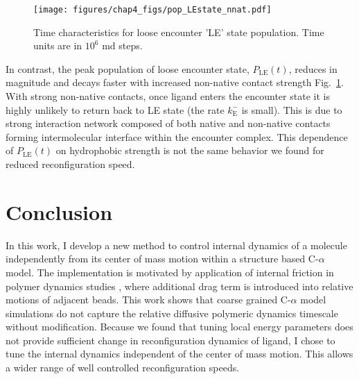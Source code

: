 \documentclass[../talant.diss.submit.tex]{subfiles}
\begin{document}
\begin{figure}[htp!]
  \centering
  \texttt{[image: figures/chap4\_figs/pop\_LEstate\_nnat.pdf]}
  \caption{ Time characteristics for loose encounter 'LE' state population.
    Time units are in $10^{6}$ md steps.}
  \label{fig:pop_LEstate_nnat}
\end{figure}
%
%

In contrast, the peak population of loose encounter state, $P_\mathrm{LE}(t)$,
reduces in magnitude and decays faster with increased
non-native contact strength Fig.~\ref{fig:pop_LEstate_nnat}.
With strong non-native contacts, once ligand enters the encounter state it is
highly unlikely to return back to LE state (the rate $k_\mathrm{E}^-$ is small).
This is due to strong interaction network composed of both native
and non-native contacts forming intermolecular interface within the encounter complex.
This dependence of $P_\mathrm{LE}(t)$ on hydrophobic strength is 
not the same behavior we found for reduced reconfiguration speed.


%
\section{\textbf{Conclusion}}\label{sect:four_seven}
%

In this work,  I develop a new method to control internal
dynamics of a molecule independently from its center of mass motion
within a structure based C-$\alpha$ model. The implementation
is motivated by application of internal friction in polymer dynamics studies
\cite{portman:01a,Gennes:1979,echeverria:14,cheng:13}, where additional drag term is
introduced into relative motions of adjacent beads.
This work
shows that
coarse grained C-$\alpha$ model simulations do not capture the relative diffusive polymeric
dynamics timescale without modification.
Because we found that 
tuning local energy parameters does not provide sufficient
change in reconfiguration dynamics of ligand,
I chose to tune the internal dynamics independent of the center of mass motion. This
allows a wider range of well controlled reconfiguration speeds.
\end{document}
